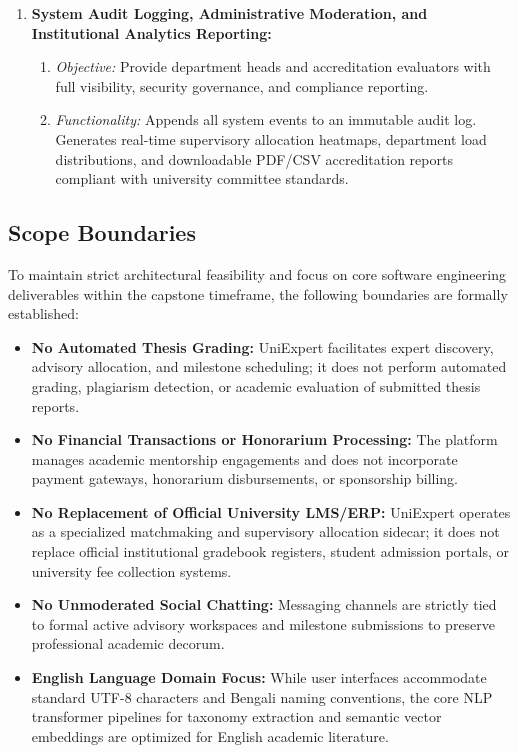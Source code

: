 \begin{enumerate}[label=\textbf{\arabic*.}]
    \item \textbf{System Audit Logging, Administrative Moderation, and Institutional Analytics Reporting:}
    \begin{enumerate}[label=(\alph*)]
        \item \textit{Objective:} Provide department heads and accreditation evaluators with full visibility, security governance, and compliance reporting.
        \item \textit{Functionality:} Appends all system events to an immutable audit log. Generates real-time supervisory allocation heatmaps, department load distributions, and downloadable PDF/CSV accreditation reports compliant with university committee standards.
    \end{enumerate}
\end{enumerate}

\subsection{Scope Boundaries}
\label{subsec:scope_boundaries}

To maintain strict architectural feasibility and focus on core software engineering deliverables within the capstone timeframe, the following boundaries are formally established:

\begin{itemize}[label=\textbf{\tiny\ensuremath{\blacksquare}}]
    \item \textbf{No Automated Thesis Grading:} UniExpert facilitates expert discovery, advisory allocation, and milestone scheduling; it does not perform automated grading, plagiarism detection, or academic evaluation of submitted thesis reports.
    \item \textbf{No Financial Transactions or Honorarium Processing:} The platform manages academic mentorship engagements and does not incorporate payment gateways, honorarium disbursements, or sponsorship billing.
    \item \textbf{No Replacement of Official University LMS/ERP:} UniExpert operates as a specialized matchmaking and supervisory allocation sidecar; it does not replace official institutional gradebook registers, student admission portals, or university fee collection systems.
    \item \textbf{No Unmoderated Social Chatting:} Messaging channels are strictly tied to formal active advisory workspaces and milestone submissions to preserve professional academic decorum.
    \item \textbf{English Language Domain Focus:} While user interfaces accommodate standard UTF-8 characters and Bengali naming conventions, the core NLP transformer pipelines for taxonomy extraction and semantic vector embeddings are optimized for English academic literature.
\end{itemize}

